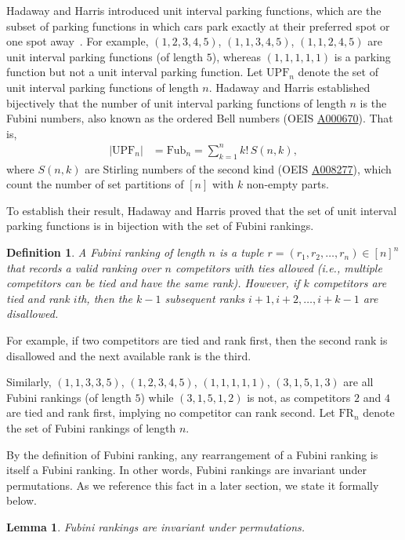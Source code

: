 \documentclass[11pt,reqno]{amsart}
\newcommand{\fr}[1]{\text{FR}_{#1}}
\newcommand{\Fub}{\mathrm{Fub}}
\newcommand{\upf}[1]{\mathrm{UPF}_{#1}}
\newtheorem{lemma}[rethm]{Lemma}
\newtheorem{definition}[rethm]{Definition}
\begin{document}
Hadaway and Harris introduced unit interval parking functions, which are the subset of parking functions in which cars park exactly at their preferred spot or one spot away~\cite{hadaway2022combinatorial}. 
For example, $(1, 2, 3, 4, 5)$, $(1, 1, 3, 4, 5)$, $(1, 1, 2, 4, 5)$ are unit interval parking functions (of length $5$), whereas $(1, 1, 1, 1, 1)$ is a parking function but not a unit interval parking function.
Let $\upf{n}$ denote the set of unit interval parking functions of length $n$.
Hadaway and Harris established bijectively that the number of unit interval parking functions of length $n$ is the Fubini numbers, also known as the ordered Bell numbers (OEIS \href{https://oeis.org/A000670}{A000670}).
That is,
\begin{align}\label{eq:fubini numbers}
 |\upf{n}|
& =
 \Fub_{n}
 =\sum_{k=1}^n k!\, S(n,k),
\end{align}
where $S(n,k)$ are Stirling numbers of the second kind (OEIS \href{https://oeis.org/A008277}{A008277}), which count the number of set partitions of $[n]$ with $k$ non-empty parts. 

To establish their result, Hadaway and Harris proved that the set of unit interval parking functions is in bijection with the set of Fubini rankings.
\begin{definition}\label{def:Fubini ranking}
  A Fubini ranking of length $n$ is a tuple $r=(r_1,r_2,\ldots,r_n)\in [n]^n$ that records a valid ranking over $n$ competitors with ties allowed (i.e., multiple competitors can be tied and have the same rank).
However, if $k$ competitors are tied and rank $i$th, then the $k-1$ subsequent ranks $i + 1, i + 2, \ldots, i + k - 1$ are disallowed.  
\end{definition}
For example, if two competitors are tied and rank first, then the second rank is disallowed and the next available rank is the third.

Similarly, $(1, 1, 3, 3, 5)$, $(1, 2, 3, 4, 5)$, $(1, 1, 1, 1, 1)$, $(3, 1, 5, 1, 3)$ are all Fubini rankings (of length $5$) while $(3, 1, 5, 1, 2)$ is not, as competitors $2$ and $4$ are tied and rank first, implying no competitor can rank second.
Let $\fr{n}$ denote the set of Fubini rankings of length $n$.

By the definition of Fubini ranking, any rearrangement of a Fubini ranking is itself a Fubini ranking.
In other words, Fubini rankings are invariant under permutations.
As we reference this fact in a later section, we state it formally below.
\begin{lemma}
\label{fubini perm invariant}
Fubini rankings are invariant under permutations.
\end{lemma}
\end{document}

